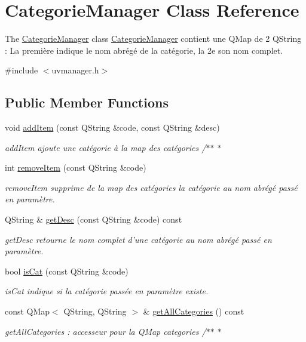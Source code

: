\hypertarget{class_categorie_manager}{\section{Categorie\+Manager Class Reference}
\label{class_categorie_manager}
}


The \hyperlink{class_categorie_manager}{Categorie\+Manager} class \hyperlink{class_categorie_manager}{Categorie\+Manager} contient une Q\+Map de 2 Q\+String \+: La première indique le nom abrégé de la catégorie, la 2e son nom complet.  




{\ttfamily \#include $<$uvmanager.\+h$>$}

\subsection*{Public Member Functions}
\begin{DoxyCompactItemize}
\item 
void \hyperlink{class_categorie_manager_a0888fdaa33d645eaf2c4e5977f6bf2fc}{add\+Item} (const Q\+String \&code, const Q\+String \&desc)
\begin{DoxyCompactList}\small\item\em add\+Item ajoute une catégorie à la map des catégories /$\ast$$\ast$ $\ast$ \end{DoxyCompactList}\item 
int \hyperlink{class_categorie_manager_a4f3453ebb942d8992570d9ee450d49d7}{remove\+Item} (const Q\+String \&code)
\begin{DoxyCompactList}\small\item\em remove\+Item supprime de la map des catégories la catégorie au nom abrégé passé en paramètre. \end{DoxyCompactList}\item 
Q\+String \& \hyperlink{class_categorie_manager_a97d678b0d5af868af4474d4fc05c9d46}{get\+Desc} (const Q\+String \&code) const 
\begin{DoxyCompactList}\small\item\em get\+Desc retourne le nom complet d'une catégorie au nom abrégé passé en paramètre. \end{DoxyCompactList}\item 
bool \hyperlink{class_categorie_manager_ab8dcf01ac835ddef441b08b44ca10e7d}{is\+Cat} (const Q\+String \&code)
\begin{DoxyCompactList}\small\item\em is\+Cat indique si la catégorie passée en paramètre existe. \end{DoxyCompactList}\item 
const Q\+Map$<$ Q\+String, Q\+String $>$ \& \hyperlink{class_categorie_manager_a96b90ece8d298ec50f3191f97ff2b1f6}{get\+All\+Categories} () const 
\begin{DoxyCompactList}\small\item\em get\+All\+Categories \+: accesseur pour la Q\+Map categories /$\ast$$\ast$ $\ast$ \end{DoxyCompactList}\end{DoxyCompactItemize}
